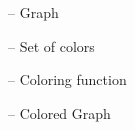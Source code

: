 \begin{description}[labelwidth=2cm]
    \item[$G$] -- Graph
    \item[$C$] -- Set of colors
    \item[$\chi$] -- Coloring function
    \item[$G_{\chi}$] -- Colored Graph
\end{description}